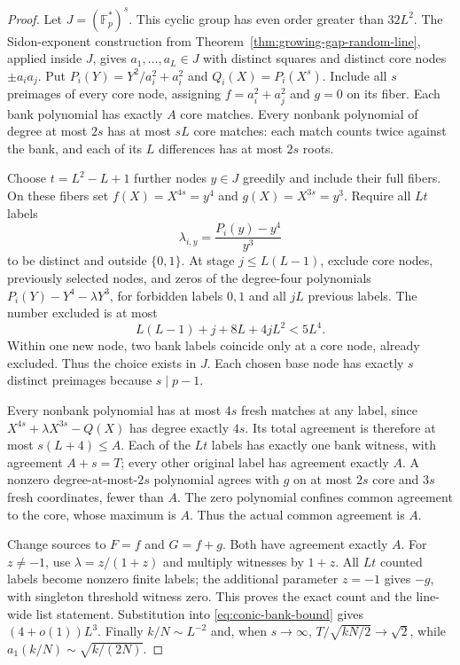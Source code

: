 \begin{proof}
Let $J=(\mathbb F_p^*)^s$. This cyclic group has even order greater than
$32L^2$. The Sidon-exponent construction from
Theorem~\ref{thm:growing-gap-random-line}, applied inside $J$, gives
$a_1,\ldots,a_L\in J$ with distinct squares and distinct core nodes
$\pm a_i a_j$. Put $P_i(Y)=Y^2/a_i^2+a_i^2$ and
$Q_i(X)=P_i(X^s)$. Include all $s$ preimages of every core node, assigning
$f=a_i^2+a_j^2$ and $g=0$ on its fiber. Each bank polynomial has exactly
$A$ core matches. Every nonbank polynomial of degree at most $2s$ has at
most $sL$ core matches: each match counts twice against the bank, and each
of its $L$ differences has at most $2s$ roots.

Choose $t=L^2-L+1$ further nodes $y\in J$ greedily and include their full
fibers. On these fibers set $f(X)=X^{4s}=y^4$ and
$g(X)=X^{3s}=y^3$. Require all $Lt$ labels
\[
 \lambda_{i,y}=\frac{P_i(y)-y^4}{y^3}
\]
to be distinct and outside $\{0,1\}$. At stage $j\le L(L-1)$, exclude
core nodes, previously selected nodes, and zeros of the degree-four
polynomials $P_i(Y)-Y^4-\lambda Y^3$, for forbidden labels $0,1$ and
all $jL$ previous labels. The number excluded is at most
\[
 L(L-1)+j+8L+4jL^2<5L^4.
\]
Within one new node, two bank labels coincide only at a core node, already
excluded. Thus the choice exists in $J$. Each chosen base node has exactly
$s$ distinct preimages because $s\mid p-1$.

Every nonbank polynomial has at most $4s$ fresh matches at any label,
since $X^{4s}+\lambda X^{3s}-Q(X)$ has degree exactly $4s$.
Its total agreement is therefore at most $s(L+4)\le A$.
Each of the $Lt$ labels has exactly one bank witness, with agreement
$A+s=T$; every other original label has agreement exactly $A$.
A nonzero degree-at-most-$2s$ polynomial agrees with $g$ on at most $2s$
core and $3s$ fresh coordinates, fewer than $A$. The zero polynomial
confines common agreement to the core, whose maximum is $A$.
Thus the actual common agreement is $A$.

Change sources to $F=f$ and $G=f+g$. Both have agreement exactly $A$.
For $z\ne-1$, use $\lambda=z/(1+z)$ and multiply witnesses by $1+z$.
All $Lt$ counted labels become nonzero finite labels; the additional
parameter $z=-1$ gives $-g$, with singleton threshold witness zero.
This proves the exact count and the line-wide list statement.
Substitution into \eqref{eq:conic-bank-bound} gives $(4+o(1))L^3$.
Finally $k/N\sim L^{-2}$ and, when $s\to\infty$,
$T/\sqrt{kN/2}\to\sqrt2$, while
$a_1(k/N)\sim\sqrt{k/(2N)}$.
\end{proof}

